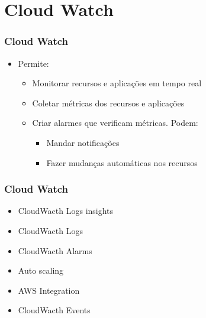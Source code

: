 \section{Cloud Watch}

\begin{frame}
	\frametitle{Cloud Watch}
	\begin{itemize}
		\item Permite:
			\begin{itemize}
				\item Monitorar recursos e aplicações em tempo real
				\item Coletar métricas dos recursos e aplicações
				\item Criar alarmes que verificam métricas. Podem:
					\begin{itemize}
						\item Mandar notificações
						\item Fazer mudanças automáticas nos recursos
					\end{itemize}
			\end{itemize}
	\end{itemize}
\end{frame}

\begin{frame}
	\frametitle{Cloud Watch}
	\begin{itemize}
		\item CloudWacth Logs insights
		\item CloudWacth Logs
		\item CloudWacth Alarms
		\item Auto scaling
		\item AWS Integration
		\item CloudWacth Events
	\end{itemize}
\end{frame}
